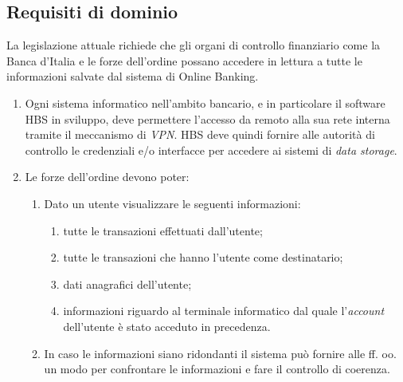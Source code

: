 \subsection{Requisiti di dominio}

La legislazione attuale richiede che gli organi di controllo finanziario come la Banca d'Italia e le forze dell'ordine possano accedere in lettura a tutte le informazioni salvate dal sistema di Online Banking.

\begin{enumerate}
\item Ogni sistema informatico nell'ambito bancario, e in particolare il software HBS in sviluppo, deve permettere l'accesso da remoto alla sua rete interna tramite il meccanismo di \emph{VPN}.
	HBS deve quindi fornire alle autorit\`a di controllo le credenziali e/o interfacce per accedere ai sistemi di \emph{data storage}.

	\item Le forze dell'ordine devono poter:
	\begin{enumerate}
    	\item Dato un utente visualizzare le seguenti informazioni:
        	\begin{enumerate}
            	\item tutte le transazioni effettuati dall'utente;
            	\item tutte le transazioni che hanno l'utente come destinatario;
	            \item dati anagrafici dell'utente;
    	        \item informazioni riguardo al terminale informatico dal quale l'\emph{account} dell'utente \`e stato acceduto in precedenza.
	        \end{enumerate}
	    \item In caso le informazioni siano ridondanti il sistema pu\`o fornire alle ff. oo. un modo per confrontare le informazioni e fare il controllo di coerenza.
	\end{enumerate}


\end{enumerate}
